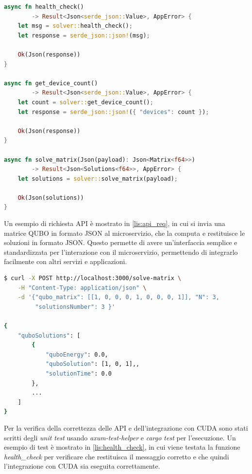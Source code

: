 \vspace{5mm}
\begin{lstlisting}[language=Rust, caption=Web API, label=lis:api]
async fn health_check()
        -> Result<Json<serde_json::Value>, AppError> {
    let msg = solver::health_check();
    let response = serde_json::json!(msg);

    Ok(Json(response))
}

async fn get_device_count()
        -> Result<Json<serde_json::Value>, AppError> {
    let count = solver::get_device_count();
    let response = serde_json::json!({ "devices": count });

    Ok(Json(response))
}

async fn solve_matrix(Json(payload): Json<Matrix<f64>>)
        -> Result<Json<Solutions<f64>>, AppError> {
    let solutions = solver::solve_matrix(payload);

    Ok(Json(solutions))
}
\end{lstlisting}
\vspace{5mm}

Un esempio di richiesta \gls{API} è mostrato in \ref{lis:api_req}, in cui si invia una matrice \gls{QUBO} in formato \gls{JSON} al microservizio, che la computa e restituisce le soluzioni in formato \gls{JSON}. Questo permette di avere un'interfaccia semplice e standardizzata per l'interazione con il microservizio, permettendo di integrarlo facilmente con altri servizi e applicazioni.

\newpage
\vspace{5mm}
\begin{lstlisting}[language=bash, caption=Esempio richiesta API, label=lis:api_req]
$ curl -X POST http://localhost:3000/solve-matrix \
    -H "Content-Type: application/json" \
    -d '{"qubo_matrix": [[1, 0, 0, 0, 1, 0, 0, 0, 1]], "N": 3,
         "solutionsNumber": 3 }'

{
    "quboSolutions": [
        {
            "quboEnergy": 0.0,
            "quboSolution": [1, 0, 1],,
            "solutionTime": 0.0
        },
        ...
    ]
}
\end{lstlisting}
\vspace{5mm}

Per la verifica della correttezza delle API e dell'integrazione con \gls{CUDA} sono stati scritti degli \textit{unit test} usando \textit{axum-test-helper} e \textit{cargo test} per l'esecuzione. Un esempio di test è mostrato in \ref{lis:health_check}, in cui viene testata la funzione \textit{health\_check} per verificare che restituisca il messaggio corretto e che quindi l'integrazione con \gls{CUDA} sia eseguita correttamente.

